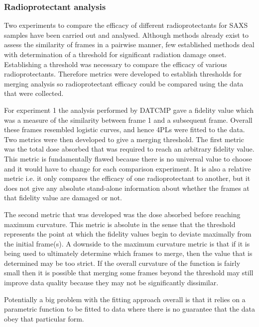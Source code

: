 \subsubsection{Radioprotectant analysis}
\label{subs:Radioprotectant analysis}
Two experiments to compare the efficacy of different radioprotectants for SAXS samples have been carried out and analysed.
Although methods already exist to assess the similarity of frames in a pairwise manner, few established methods deal with determination of a threshold for significant radiation damage onset.
Establishing a threshold was necessary to compare the efficacy of various radioprotectants.
Therefore metrics were developed to establish thresholds for merging analysis so radioprotectant efficacy could be compared using the data that were collected.

For experiment 1 the analysis performed by DATCMP gave a fidelity value which was a measure of the similarity between frame 1 and a subsequent frame.
Overall these frames resembled logistic curves, and hence 4PLs were fitted to the data.
Two metrics were then developed to give a merging threshold. The first metric was the total dose absorbed that was required to reach an arbitrary fidelity value.
This metric is fundamentally flawed because there is no universal value to choose and it would have to change for each comparison experiment.
It is also a relative metric i.e. it only compares the efficacy of one radioprotectant to another, but it does not give any absolute stand-alone information about whether the frames at that fidelity value are damaged or not.

The second metric that was developed was the dose absorbed before reaching maximum curvature.
This metric is absolute in the sense that the threshold represents the point at which the fidelity values begin to deviate maximally from the initial frame(s).
A downside to the maximum curvature metric is that if it is being used to ultimately determine which frames to merge, then the value that is determined may be too strict.
If the overall curvature of the function is fairly small then it is possible that merging some frames beyond the threshold may still improve data quality because they may not be significantly dissimilar.

Potentially a big problem with the fitting approach overall is that it relies on a parametric function to be fitted to data where there is no guarantee that the data obey that particular form.

